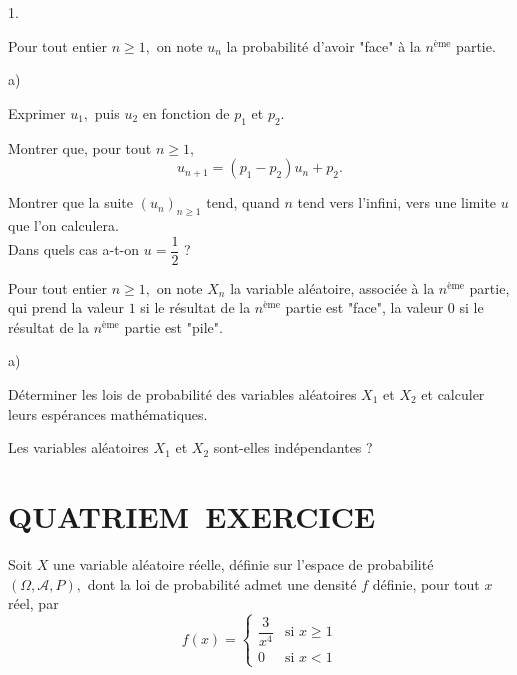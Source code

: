 \documentclass[11pt]{article}%
\begin{document}
\begin{noliste}{1.}
 \setlength{\itemsep}{4mm}
\item Pour tout entier $n\geq 1,$ on note $u_{n}$ la probabilité
d'avoir "face" à la $n^{\text{ème}}$ partie.

\begin{noliste}{a)}
 \setlength{\itemsep}{2mm}
\item Exprimer $u_{1},$ puis $u_{2}$ en fonction de $p_{1}$ et $p_{2}.$

\item Montrer que, pour tout $n\geq 1,$
\[
u_{n + 1} = (p_{1}-p_{2})u_{n} + p_{2}.
\]

\item Montrer que la suite $(u_{n})_{n\geq 1}$ tend, quand $n$ tend
vers l'infini, vers une limite $u$ que l'on calculera.\\
Dans quels cas a-t-on $u = \dfrac{1}{2}$ ?
\end{noliste}

\item Pour tout entier $n\geq 1,$ on note $X_{n}$ la variable
aléatoire, associée à la $n^{\text{ème}}$ partie, qui prend la valeur
$1$ si le résultat de la $n^{\text{ème}}$ partie est "face", la valeur
$0$ si le résultat de la $n^{\text{ème}}$ partie est "pile".

\begin{noliste}{a)}
 \setlength{\itemsep}{2mm}
\item Déterminer les lois de probabilité des variables aléatoires
$X_{1}$ et 
$X_{2}$ et calculer leurs espérances mathématiques.

\item Les variables aléatoires $X_{1}$ et $X_{2}$ sont-elles
indépendantes ?
\end{noliste}
\end{noliste}

\section*{QUATRIEM\E\ EXERCICE}

Soit $X$ une variable aléatoire réelle, définie sur l'espace de
probabilité $(\Omega,\mathcal{A},P),$ dont la loi de probabilité admet
une densité $f$ définie, pour tout $x$ réel, par 
\[
f(x) = \left\{ 
\begin{array}{cc}
\dfrac{3}{x^{4}} & \text{si }x\geq 1\\
0 & \text{si }x<1
\end{array}
\right.
\]
\end{document}
